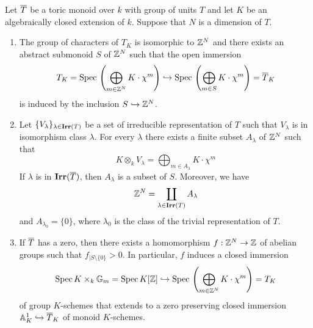 \begin{theorem}\label{theorem:toric_monoids_properties_Kempf_torus}
Let $\overline{T}$ be a toric monoid over $k$ with group of units $T$ and let $K$ be an algebraically closed extension of $k$. Suppose that $N$ is a dimension of $T$.
\begin{enumerate}[label=\emph{\textbf{(\arabic*)}}, leftmargin=3.0em]
\item The group of characters of $T_K$ is isomorphic to ${\mathbb Z}^N$ and there exists an abstract submonoid $S$ of ${\mathbb Z}^N$ such that the open immersion
$$T_K = \mathrm{Spec}\,\left(\bigoplus_{m\in {\mathbb Z}^N}K\cdot \chi^m\right) \hookrightarrow \mathrm{Spec}\,\left(\bigoplus_{m\in S}K\cdot \chi^m\right) = \overline{T}_K$$
is induced by the inclusion $S\hookrightarrow {\mathbb Z}^N$.
\item Let $\{V_{\lambda}\}_{\lambda\in \mathbf{Irr}(T)}$ be a set of irreducible representation of $T$ such that $V_{\lambda}$ is in isomorphism class $\lambda$. For every $\lambda$ there exists a finite subset $A_{\lambda}$ of ${\mathbb Z}^N$ such that
$$K\otimes_kV_{\lambda} = \bigoplus_{m\in A_{\lambda}}K\cdot \chi^m$$
If $\lambda$ is in  $\mathbf{Irr}(\overline{T})$, then $A_{\lambda}$ is a subset of $S$. Moreover, we have
$${\mathbb Z}^N = \coprod_{\lambda\in \mathbf{Irr}(T)}A_{\lambda}$$
and $A_{\lambda_0} = \{0\}$, where $\lambda_0$ is the class of the trivial representation of $T$.
\item If $\overline{T}$ has a zero, then there exists a homomorphism $f:{\mathbb Z}^N\rightarrow {\mathbb Z}$ of abelian groups such that $f_{\mid S\setminus \{0\}}>0$. In particular, $f$ induces a closed immersion
$$\mathrm{Spec}\, K\times_k \mathbb{G}_{m} = \mathrm{Spec}\, K[{\mathbb Z}]\hookrightarrow \mathrm{Spec}\, \left(\bigoplus_{m\in {\mathbb Z}^N}K\cdot \chi^m\right) = T_K$$
of group $K$-schemes that extends to a zero preserving closed immersion $\mathbb{A}^1_K\hookrightarrow \overline{T}_K$ of monoid $K$-schemes.
\end{enumerate}
\end{theorem}

